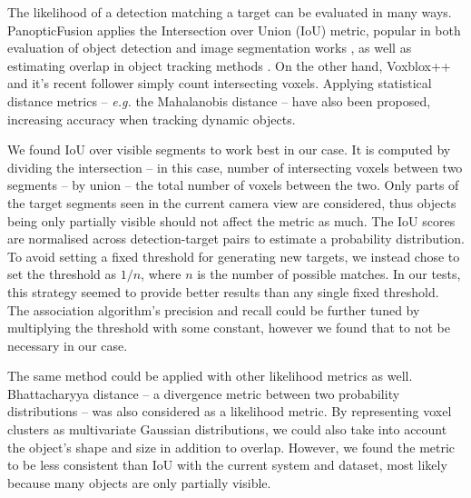 
The likelihood of a detection matching a target can be evaluated in many ways. PanopticFusion \cite{panopticfusion} applies the Intersection over Union (IoU) metric, popular in both evaluation of object detection and image segmentation works \cite{p_voc,panoptic_segmentation}, as well as estimating overlap in object tracking methods \cite{ab3dmot}. On the other hand, Voxblox++ \cite{voxblox++} and it's recent follower \cite{interactive_3d_scenes} simply count intersecting voxels. Applying statistical distance metrics -- \textit{e.g.} the Mahalanobis distance \cite{mahalanobis} -- have also been proposed, increasing accuracy when tracking dynamic objects. \cite{probabilistic_3d_mot,two_stage_data_association}

We found IoU over visible segments to work best in our case. It is computed by dividing the intersection -- in this case, number of intersecting voxels between two segments -- by union -- the total number of voxels between the two. Only parts of the target segments seen in the current camera view are considered, thus objects being only partially visible should not affect the metric as much. The IoU scores are normalised across detection-target pairs to estimate a probability distribution. To avoid setting a fixed threshold for generating new targets, we instead chose to set the threshold as $1/n$, where $n$ is the number of possible matches. In our tests, this strategy seemed to provide better results than any single fixed threshold. The association algorithm's precision and recall could be further tuned by multiplying the threshold with some constant, however we found that to not be necessary in our case.

The same method could be applied with other likelihood metrics as well. Bhattacharyya distance \cite{bhattacharyya} -- a divergence metric between two probability distributions -- was also considered as a likelihood metric. By representing voxel clusters as multivariate Gaussian distributions, we could also take into account the object's shape and size in addition to overlap. However, we found the metric to be less consistent than IoU with the current system and dataset, most likely because many objects are only partially visible.